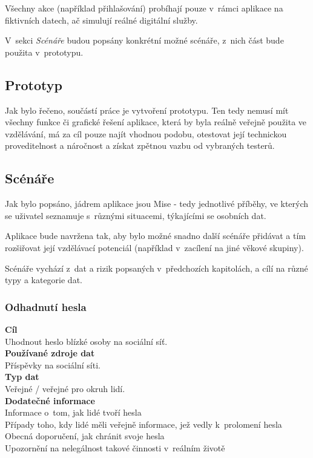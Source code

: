 Všechny akce (například přihlašování) probíhají pouze v~rámci aplikace na fiktivních datech, ač simulují reálné digitální služby.

V~sekci \textit{Scénáře} budou popsány konkrétní možné scénáře, z~nich část bude použita v~prototypu.

\subsection{Prototyp}
Jak bylo řečeno, součástí práce je vytvoření prototypu. Ten tedy nemusí mít všechny funkce či grafické řešení aplikace, která by byla reálně veřejně použita ve vzdělávání, má za cíl pouze najít vhodnou podobu, otestovat její technickou proveditelnost a náročnost a získat zpětnou vazbu od vybraných testerů.


\subsection{Scénáře}
Jak bylo popsáno, jádrem aplikace jsou Mise - tedy jednotlivé příběhy, ve kterých se uživatel seznamuje s~různými situacemi, týkajícími se osobních dat.

Aplikace bude navržena tak, aby bylo možné snadno další scénáře přidávat a tím rozšiřovat její vzdělávací potenciál (například v~zacílení na jiné věkové skupiny).

Scénáře vychází z~dat a rizik popsaných v~předchozích kapitolách, a cílí na různé typy a kategorie dat.


\subsubsection*{Odhadnutí hesla}
\textbf{Cíl}\\
Uhodnout heslo blízké osoby na sociální síť.\\
\textbf{Používané zdroje dat}\\
Příspěvky na sociální síti.\\
\textbf{Typ dat}\\
Veřejné / veřejné pro okruh lidí.\\
\textbf{Dodatečné informace}\\
Informace o~tom, jak lidé tvoří hesla\\
Případy toho, kdy lidé měli veřejně informace, jež vedly k~prolomení hesla\\
Obecná doporučení, jak chránit svoje hesla\\
Upozornění na nelegálnost takové činnosti v~reálním životě\\

